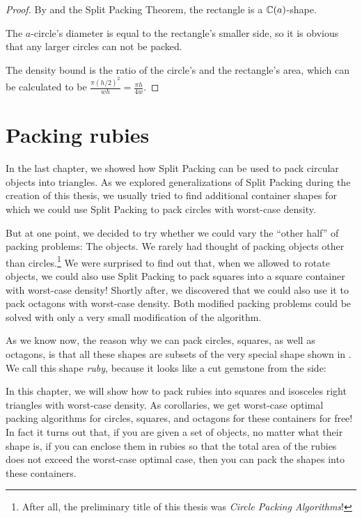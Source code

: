 \documentclass[a4paper,style=print,oneside,bibliography=totoc,nexus,lnum,extramargin]{tubsbook}
\begin{document}
\begin{proof}
    By  and the Split Packing Theorem, the rectangle is a $\mathbb{C}(a)$-shape.

    The $a$-circle's diameter is equal to the rectangle's smaller side, so it is obvious that any larger circles can not be packed.

    The density bound is the ratio of the circle's and the rectangle's area, which can be calculated to be $\frac{\pi (h/2)^2}{wh} = \frac{\pi h}{4w}$.
\end{proof}


\chapter{Packing rubies}\label{ch:rubies}

In the last chapter, we showed how Split Packing can be used to pack circular objects into triangles.
As we explored generalizations of Split Packing during the creation of this thesis, we usually tried to find additional container shapes for which we could use Split Packing to pack circles with worst-case density. 

But at one point, we decided to try whether we could vary the “other half” of packing problems: The objects. We rarely had thought of packing objects other than circles.\footnote{After all, the preliminary title of this thesis was \emph{Circle Packing Algorithms}!} 
We were surprised to find out that, when we allowed to rotate objects, we could also use Split Packing to pack squares into a square container with worst-case density! Shortly after, we discovered that we could also use it to pack octagons with worst-case density. Both modified packing problems could be solved with only a very small modification of the algorithm.

As we know now, the reason why we can pack circles, squares, as well as octagons, is that all these shapes are subsets of the very special shape shown in . We call this shape \emph{ruby}, because it looks like a cut gemstone from the side:


In this chapter, we will show how to pack rubies into squares and isosceles right triangles with worst-case density. As corollaries, we get worst-case optimal packing algorithms for circles, squares, and octagons for these containers for free!
In fact it turns out that, if you are given a set of objects, no matter what their shape is, if you can enclose them in rubies so that the total area of the rubies does not exceed the worst-case optimal case, then you can pack the shapes into these containers.
\end{document}
